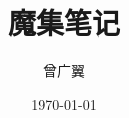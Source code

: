 \documentclass[twoside,a4paper,openright,titlepage,draft]{ctexrep}
\begin{document}
\begin{titlepage}

\title{魔集笔记}
\author{曾广翼}
\date{\today}
\maketitle

\end{titlepage}
\end{document}
